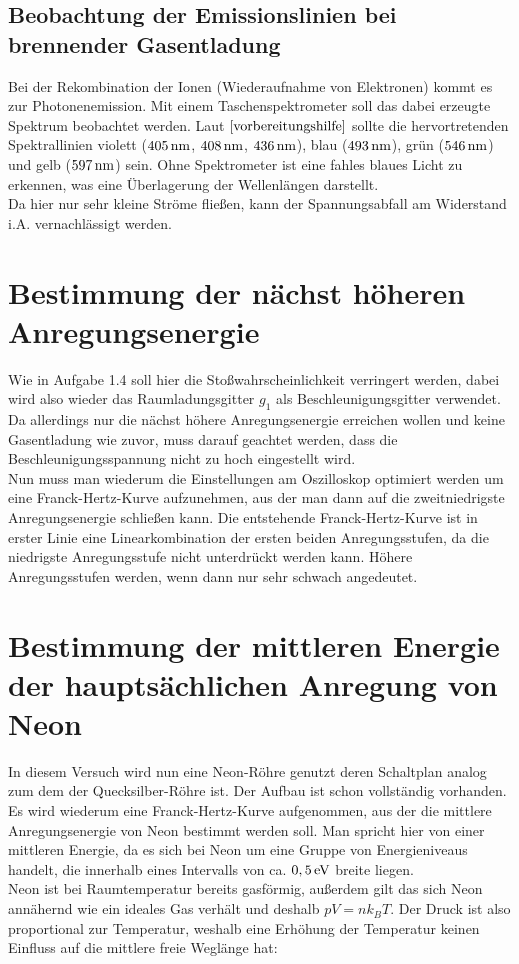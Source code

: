 \documentclass[a4paper,titlepage]{scrartcl}
\numberwithin{equation}{section}
\begin{document}
\newpage
\subsection{Beobachtung der Emissionslinien bei brennender Gasentladung}

Bei der Rekombination der Ionen (Wiederaufnahme von Elektronen) kommt es zur Photonenemission. Mit einem Taschenspektrometer soll das dabei erzeugte Spektrum beobachtet werden. Laut $\cite{vorbereitungshilfe}$ sollte die hervortretenden Spektrallinien violett ($\unit[405]{nm}$, $\unit[408]{nm}$, $\unit[436]{nm}$), blau ($\unit[493]{nm}$), grün ($\unit[546]{nm}$) und gelb ($\unit[597]{nm}$) sein. Ohne Spektrometer ist eine fahles blaues Licht zu erkennen, was eine Überlagerung der Wellenlängen darstellt.\\
Da hier nur sehr kleine Ströme fließen, kann der Spannungsabfall am Widerstand i.A. vernachlässigt werden.

\newpage
\section{Bestimmung der nächst höheren Anregungsenergie}

Wie in Aufgabe 1.4 soll hier die Stoßwahrscheinlichkeit verringert werden, dabei wird also wieder das Raumladungsgitter $g_1$ als Beschleunigungsgitter verwendet. Da allerdings nur die nächst höhere Anregungsenergie erreichen wollen und keine Gasentladung wie zuvor, muss darauf geachtet werden, dass die Beschleunigungsspannung nicht zu hoch eingestellt wird.\\
Nun muss man wiederum die Einstellungen am Oszilloskop optimiert werden um eine Franck-Hertz-Kurve aufzunehmen, aus der man dann auf die zweitniedrigste Anregungsenergie schließen kann. Die entstehende Franck-Hertz-Kurve ist in erster Linie eine Linearkombination der ersten beiden Anregungsstufen, da die niedrigste Anregungsstufe nicht unterdrückt werden kann. Höhere Anregungsstufen werden, wenn dann nur sehr schwach angedeutet.

\section{Bestimmung der mittleren Energie der hauptsächlichen Anregung von Neon}

In diesem Versuch wird nun eine Neon-Röhre genutzt deren Schaltplan analog zum dem der Quecksilber-Röhre ist. Der Aufbau ist schon vollständig vorhanden. Es wird wiederum eine Franck-Hertz-Kurve aufgenommen, aus der die mittlere Anregungsenergie von Neon bestimmt werden soll. Man spricht hier von einer mittleren Energie, da es sich bei Neon um eine Gruppe von Energieniveaus handelt, die innerhalb eines Intervalls von ca. $\unit[0,5]{eV}$ breite liegen.\\
Neon ist bei Raumtemperatur bereits gasförmig, außerdem gilt das sich Neon annähernd wie ein ideales Gas verhält und deshalb $pV = nk_B T$. Der Druck ist also proportional zur Temperatur, weshalb eine Erhöhung der Temperatur keinen Einfluss auf die mittlere freie Weglänge hat:
\end{document}
